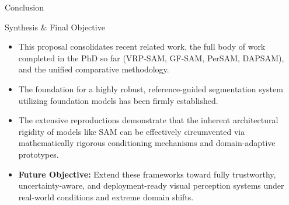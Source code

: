 \documentclass[aspectratio=169, 10pt]{beamer}
\begin{document}
\begin{frame}{Conclusion}
    \begin{exampleblock}{Synthesis \& Final Objective}
        \footnotesize
        \begin{itemize}
            \item This proposal consolidates recent related work, the full body of work completed in the PhD so far (VRP-SAM, GF-SAM, PerSAM, DAPSAM), and the unified comparative methodology.
            \item The foundation for a highly robust, reference-guided segmentation system utilizing foundation models has been firmly established.
            \item The extensive reproductions demonstrate that the inherent architectural rigidity of models like SAM can be effectively circumvented via mathematically rigorous conditioning mechanisms and domain-adaptive prototypes.
            \item \textbf{Future Objective:} Extend these frameworks toward fully trustworthy, uncertainty-aware, and deployment-ready visual perception systems under real-world conditions and extreme domain shifts.
        \end{itemize}
    \end{exampleblock}
\end{frame}
\end{document}
